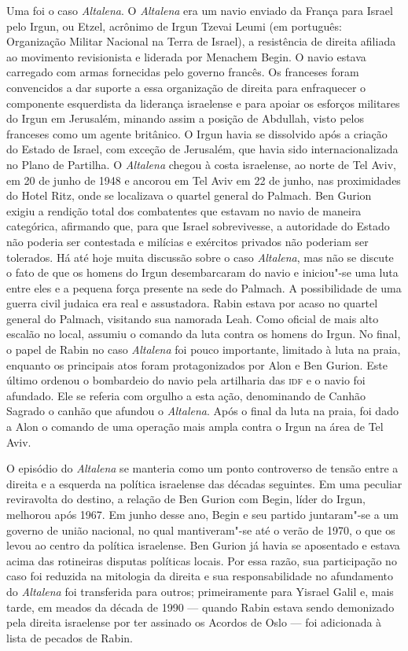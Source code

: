 Uma foi o caso \textit{Altalena}. O \textit{Altalena} era um navio enviado
da França para Israel pelo Irgun, ou Etzel, acrônimo de Irgun Tzevai
Leumi (em português: Organização Militar Nacional na Terra de Israel), 
a resistência de direita afiliada ao movimento revisionista e
liderada por Menachem Begin. O navio estava carregado com armas
fornecidas pelo governo francês. Os franceses foram convencidos a dar suporte a
essa organização de direita para enfraquecer o componente esquerdista da
liderança israelense e para apoiar os esforços militares do Irgun em
Jerusalém, minando assim a posição de Abdullah, visto pelos franceses
como um agente britânico. O Irgun havia se dissolvido após a criação do
Estado de Israel, com exceção de Jerusalém, que havia sido
internacionalizada no Plano de Partilha. O \textit{Altalena} chegou à
costa israelense, ao norte de Tel Aviv, em 20 de junho de 1948 e ancorou em Tel
Aviv em 22 de junho, nas proximidades do Hotel Ritz, onde se localizava o quartel
general do Palmach. Ben Gurion exigiu a rendição total dos combatentes
que estavam no navio de maneira categórica, afirmando que, para que Israel
sobrevivesse, a autoridade do Estado não poderia ser contestada e
milícias e exércitos privados não poderiam ser tolerados. Há até hoje
muita discussão sobre o caso \textit{Altalena}, mas não se discute o fato
de que os homens do Irgun desembarcaram do navio e iniciou"-se uma luta
entre eles e a pequena força presente na sede do Palmach. A
possibilidade de uma guerra civil judaica era real e assustadora. Rabin
estava por acaso no quartel general do Palmach, visitando sua namorada
Leah. Como oficial de mais alto escalão no local, assumiu o comando da
luta contra os homens do Irgun. No final, o papel de Rabin no caso
\textit{Altalena} foi pouco importante, limitado à luta na praia, enquanto
os principais atos foram protagonizados por Alon e Ben Gurion. Este último
ordenou o bombardeio do navio pela artilharia das \textsc{idf} e o navio foi
afundado. Ele se referia com orgulho a esta ação, denominando de Canhão
Sagrado o canhão que afundou o \textit{Altalena}. Após o final da luta na
praia, foi dado a Alon o comando de uma operação mais ampla contra o
Irgun na área de Tel Aviv.

O episódio do \textit{Altalena} se manteria como um ponto controverso de
tensão entre a direita e a esquerda na política israelense das décadas
seguintes. Em uma peculiar reviravolta do destino, a relação de Ben
Gurion com Begin, líder do Irgun, melhorou após 1967. Em junho desse ano,
Begin e seu partido juntaram"-se a um governo de união nacional, no qual
mantiveram"-se até o verão de 1970, o que os levou ao centro da
política israelense. Ben Gurion já havia se aposentado e estava acima
das rotineiras disputas políticas locais. Por essa razão, sua
participação no caso foi reduzida na mitologia da direita
e sua responsabilidade no afundamento do \textit{Altalena} foi transferida
para outros; primeiramente para Yisrael Galil e, mais tarde, em meados da
década de 1990 --- quando Rabin estava sendo demonizado pela direita
israelense por ter assinado os Acordos de Oslo --- foi adicionada à lista
de pecados de Rabin.


